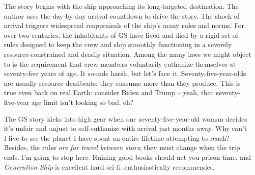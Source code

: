 The story begins with the ship approaching its long-targeted
destination. The author uses the day-by-day arrival countdown to drive
the story. The shock of arrival triggers widespread reappraisals of the
ship's many rules and norms. For over two centuries, the inhabitants of
GS have lived and died by a rigid set of rules designed to keep the crew and 
ship smoothly functioning in a severely
resource-constrained and deadly situation. Among the many laws we might
object to is the requirement that crew members voluntarily euthanize
themselves at seventy-five years of age. It sounds harsh, but let's face
it. Seventy-five-year-olds are usually resource deadbeats; they consume
more than they produce. This is true even back on real Earth: consider
Biden and Trump -- yeah, that seventy-five-year age limit isn't looking
so bad, eh?

The GS story kicks into high gear when one seventy-five-year-old woman
decides it's unfair and unjust to self-euthanize with arrival just
months away. Why can't I live to see the planet I have spent an entire
lifetime attempting to reach? Besides, the rules \emph{are for travel
between stars}; they must change when the trip ends. I'm going to stop
here. Ruining good books should net you prison time, and
\emph{Generation Ship} is excellent hard sci-fi: enthusiastically
recommended.


%
 

